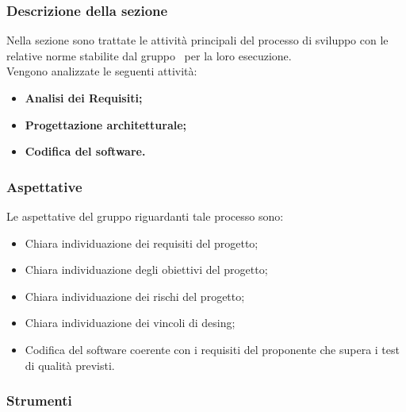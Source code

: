 \subsubsection{Descrizione della sezione} 
Nella sezione sono trattate le attività principali del processo di sviluppo con le relative norme stabilite dal gruppo \Gruppo\ per la loro esecuzione. \\
Vengono analizzate le seguenti attività:
\begin{itemize}
\item \textbf{Analisi dei Requisiti;}
\item \textbf{Progettazione architetturale;}
\item \textbf{Codifica del software.}
\end{itemize}

\subsubsection{Aspettative}
Le aspettative del gruppo riguardanti tale processo sono:
\begin{itemize}
\item Chiara individuazione dei requisiti del progetto;
\item Chiara individuazione degli obiettivi del progetto;
\item Chiara individuazione dei rischi del progetto;
\item Chiara individuazione dei vincoli di desing;
\item Codifica del software coerente con i requisiti del proponente che supera i test di qualità previsti.
\end{itemize}





\subsubsection{Strumenti}
\newpage
